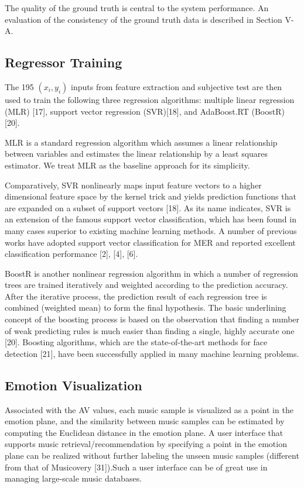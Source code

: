 \documentclass[journal, twoside]{IEEEtran}
\begin{document}
The quality of the ground truth is central to the system performance. An evaluation of the consistency of the ground truth
data is described in Section V-A.

\subsection{Regressor Training}
The 195 \((x_i,y_i)\) inputs from feature extraction and subjective test are then used to train the following three regression algorithms: multiple linear regression (MLR) [17], support vector regression (SVR)[18], and AdaBoost.RT (BoostR) [20].

MLR is a standard regression algorithm which assumes a linear relationship between variables and estimates the linear relationship by a least squares estimator. We treat MLR as the baseline approach for its simplicity.

Comparatively, SVR nonlinearly maps input feature vectors to a higher dimensional feature space by the kernel trick and yields prediction functions that are expanded on a subset of support vectors [18]. As its name indicates, SVR is an extension of the famous support vector classification, which has been found in many cases superior to existing machine learning methods. A number of previous works have adopted support vector classification for MER and reported excellent classification performance [2], [4], [6].

BoostR is another nonlinear regression algorithm in which a number of regression trees are trained iteratively and weighted according to the prediction accuracy. After the iterative process, the prediction result of each regression tree is combined (weighted mean) to form the final hypothesis. The basic underlining concept of the boosting process is based on the observation that finding a number of weak predicting rules is much easier than finding a single, highly accurate one [20]. Boosting algorithms, which are the state-of-the-art methods for face detection [21], have been successfully applied in many
machine learning problems.

\subsection{Emotion Visualization}
Associated with the AV values, each music sample is visualized as a point in the emotion plane, and the similarity between music samples can be estimated by computing the Euclidean distance in the emotion plane. A user interface that supports music retrieval/recommendation by specifying a point in the emotion plane can be realized without further labeling the unseen music samples (different from that of Musicovery [31]).Such a user interface can be of great use in managing large-scale music databases.
\end{document}
